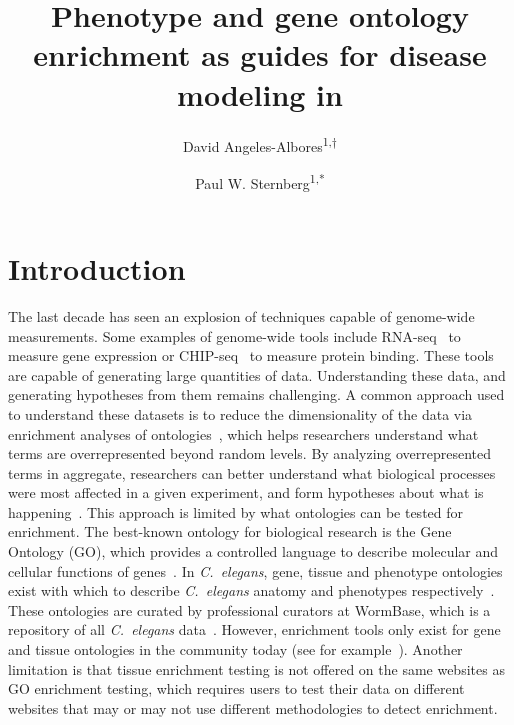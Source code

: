 \documentclass[10pt,letterpaper,twocolumn]{article}
\title{
  \Large
  \textbf{
  Phenotype and gene ontology enrichment as guides for disease modeling
  in \cel{}
          }
}
\author{David Angeles-Albores\textsuperscript{1,$\dagger{}$}
\and{}
Paul W. Sternberg\textsuperscript{1,*}
}
\newcommand{\cel}{\emph{C.~elegans}}
\begin{document}

\twocolumn[
\maketitle


]
\nolinenumbers{}

\section*{Introduction}
The last decade has seen an explosion of techniques capable of genome-wide
measurements. Some examples of genome-wide tools include
RNA-seq~\cite{Mortazavi2008} to measure gene expression or
CHIP-seq~\cite{Johnson2007} to measure protein binding. These tools are capable
of generating large quantities of data. Understanding these data, and generating
hypotheses from them remains challenging. A common approach used to understand
these datasets is to reduce the dimensionality of the data via enrichment
analyses of ontologies~\cite{TheGeneOntologyConsortium2000a}, which helps
researchers understand what terms are
overrepresented beyond random levels. By analyzing overrepresented terms in
aggregate, researchers can better understand what biological processes were most
affected in a given experiment, and form hypotheses about what is
happening~\cite{Rhee2008}.
This approach is limited by what ontologies can be tested for enrichment.
The best-known ontology for biological research is the Gene Ontology (GO), which
provides a controlled language to describe molecular and cellular functions of
genes~\cite{TheGeneOntologyConsortium2000a}.
In \cel{}, gene, tissue and phenotype ontologies exist
with which to describe \cel{} anatomy and phenotypes
respectively~\cite{Schindelman2011,Lee2003}. These ontologies are curated by
professional curators at WormBase, which is a repository of all \cel{}
data~\cite{Howe2016}.
However, enrichment tools
only exist for gene and tissue ontologies
in the community today (see for example~\cite{Chikina2009,Mi2013,Angeles-Albores2016}).
Another limitation is that
tissue enrichment testing is not offered on the same websites as GO enrichment
testing, which requires users to test their data on different websites that may
or may not use different methodologies to detect enrichment.
\end{document}
